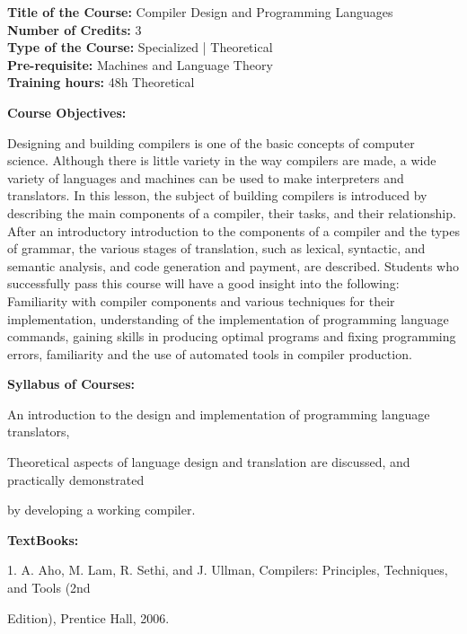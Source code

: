 \documentclass[12pt,a4paper]{article}
\begin{document}
\newpage
\textbf{Title of the Course:} Compiler Design and Programming Languages\\
\textbf{Number of Credits:} 3\\
\textbf{Type of the Course:} Specialized | Theoretical\\
\textbf{Pre-requisite:} Machines and Language Theory\\
\textbf{Training hours:} 48h Theoretical\par\vspace{4pt}
\textbf{Course Objectives:}\par\vspace{2pt}
Designing and building compilers is one of the basic concepts of computer science. Although there
is little variety in the way compilers are made, a wide variety of languages and machines can be
used to make interpreters and translators. In this lesson, the subject of building compilers is
introduced by describing the main components of a compiler, their tasks, and their relationship.
After an introductory introduction to the components of a compiler and the types of grammar, the
various stages of translation, such as lexical, syntactic, and semantic analysis, and code generation
and payment, are described. Students who successfully pass this course will have a good insight
into the following: Familiarity with compiler components and various techniques for their
implementation, understanding of the implementation of programming language commands,
gaining skills in producing optimal programs and fixing programming errors, familiarity and the
use of automated tools in compiler production.\par\vspace{4pt}
\textbf{Syllabus of Courses:}\par\vspace{2pt}
An introduction to the design and implementation of programming language translators,\par
Theoretical aspects of language design and translation are discussed, and practically demonstrated\par
by developing a working compiler.\par\vspace{4pt}
\textbf{TextBooks:}\par\vspace{2pt}
1. A. Aho, M. Lam, R. Sethi, and J. Ullman, Compilers: Principles, Techniques, and Tools (2nd\par
Edition), Prentice Hall, 2006.\par
\vspace{4pt}
\end{document}
